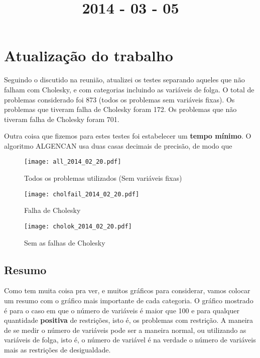 \documentclass{article}
\title{2014 - 03 - 05}
\author{}
\date{}
\renewcommand{\emph}[1]{\textbf{#1}}
\begin{document}
\maketitle
\section{Atualização do trabalho}

Seguindo o discutido na reunião, atualizei os testes separando aqueles que não
falham com Cholesky, e com categorias incluindo as variáveis de folga.
O total de problemas considerado foi 873 (todos os problemas sem variáveis
fixas).
Os problemas que tiveram falha de Cholesky foram 172.
Os problemas que não tiveram falha de Cholesky foram 701.

Outra coisa que fizemos para estes testes foi estabelecer um {\bf tempo
mínimo}. O algoritmo ALGENCAN usa duas casas decimais de precisão, de modo que


\begin{figure}[H]
  \centering
  \texttt{[image: all\_2014\_02\_20.pdf]}
  \caption{Todos os problemas utilizados (Sem variáveis fixas) }
\end{figure}
\begin{figure}[H]
  \centering
  \texttt{[image: cholfail\_2014\_02\_20.pdf]}
  \caption{Falha de Cholesky}
\end{figure}
\begin{figure}[H]
  \centering
  \texttt{[image: cholok\_2014\_02\_20.pdf]}
  \caption{Sem as falhas de Cholesky}
\end{figure}

\newpage
\subsection{Resumo}

Como tem muita coisa pra ver, e muitos gráficos para considerar, vamos colocar
um resumo com o gráfico mais importante de cada categoria.
O gráfico mostrado é para o caso em que o número de variáveis é maior que 100 e
para qualquer quantidade \emph{positiva} de restrições, isto é, os problemas com
restrição. A maneira de se medir o número de variáveis pode ser a maneira
normal, ou utilizando as variáveis de folga, isto é, o número de variável é na
verdade o número de variáveis mais as restrições de desigualdade.
\end{document}
